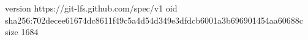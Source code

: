 version https://git-lfs.github.com/spec/v1
oid sha256:702decee61674dc8611f49c5a4d54d349e3dfdcb6001a3b696901454aa60688c
size 1684
